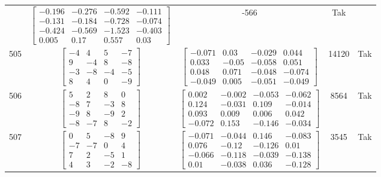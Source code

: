 \documentclass[a4paper,12pt]{article}
\begin{document}
\begin{tabular}{c c c c c}
&
$\begin{bmatrix} -0.196 & -0.276 & -0.592 & -0.111 \\ -0.131 & -0.184 & -0.728 & -0.074 \\ -0.424 & -0.569 & -1.523 & -0.403 \\ 0.005 & 0.17 & 0.557 & 0.03 \end{bmatrix}$
&
-566
&
Tak
\\
505
&
$\begin{bmatrix} -4 & 4 & 5 & -7 \\ 9 & -4 & 8 & -8 \\ -3 & -8 & -4 & -5 \\ 8 & 4 & 0 & -9 \end{bmatrix}$
&
$\begin{bmatrix} -0.071 & 0.03 & -0.029 & 0.044 \\ 0.033 & -0.05 & -0.058 & 0.051 \\ 0.048 & 0.071 & -0.048 & -0.074 \\ -0.049 & 0.005 & -0.051 & -0.049 \end{bmatrix}$
&
14120
&
Tak
\\
506
&
$\begin{bmatrix} 5 & 2 & 8 & 0 \\ -8 & 7 & -3 & 8 \\ -9 & 8 & -9 & 2 \\ -8 & -7 & 8 & -2 \end{bmatrix}$
&
$\begin{bmatrix} 0.002 & -0.002 & -0.053 & -0.062 \\ 0.124 & -0.031 & 0.109 & -0.014 \\ 0.093 & 0.009 & 0.006 & 0.042 \\ -0.072 & 0.153 & -0.146 & -0.034 \end{bmatrix}$
&
8564
&
Tak
\\
507
&
$\begin{bmatrix} 0 & 5 & -8 & 9 \\ -7 & -7 & 0 & 4 \\ 7 & 2 & -5 & 1 \\ 4 & 3 & -2 & -8 \end{bmatrix}$
&
$\begin{bmatrix} -0.071 & -0.044 & 0.146 & -0.083 \\ 0.076 & -0.12 & -0.126 & 0.01 \\ -0.066 & -0.118 & -0.039 & -0.138 \\ 0.01 & -0.038 & 0.036 & -0.128 \end{bmatrix}$
&
3545
&
Tak
\\

\end{tabular}
\end{document}
